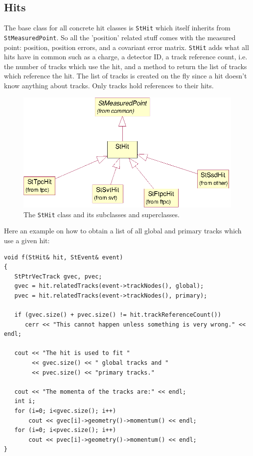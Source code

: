 \documentclass[twoside]{article}
\begin{document}
\subsection{Hits}
  The base class for all concrete
hit classes is \texttt{StHit} which itself inherits from
\texttt{StMeasuredPoint}. So all the 'position' related stuff comes
with the measured point: position, position errors, and a covariant
error matrix.  \texttt{StHit} adds what all hits have in common such
as a charge, a detector ID, a track reference count, i.e. the number
of tracks which use the hit, and a method to return the list of
tracks which reference the hit.  The list of tracks is created on the
fly since a hit doesn't know anything about tracks. Only tracks hold
references to their hits.
\begin{figure}[htb]
    \begin{center}
        \includegraphics{hits.eps}
        \caption{The \texttt{StHit} class and its subclasses and superclasses.}
        \label{fig:hits}
    \end{center}
\end{figure}

Here an example on how to obtain a list of all global and primary
tracks which use a given hit:
\begin{verbatim}
void f(StHit& hit, StEvent& event)
{
   StPtrVecTrack gvec, pvec;
   gvec = hit.relatedTracks(event->trackNodes(), global);
   pvec = hit.relatedTracks(event->trackNodes(), primary);

   if (gvec.size() + pvec.size() != hit.trackReferenceCount())
      cerr << "This cannot happen unless something is very wrong." << endl;

   cout << "The hit is used to fit "
        << gvec.size() << " global tracks and "
        << pvec.size() << "primary tracks."

   cout << "The momenta of the tracks are:" << endl;
   int i;
   for (i=0; i<gvec.size(); i++)
       cout << gvec[i]->geometry()->momentum() << endl;
   for (i=0; i<pvec.size(); i++)
       cout << pvec[i]->geometry()->momentum() << endl;
}

\end{verbatim}
\end{document}

